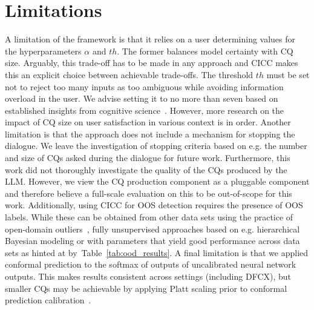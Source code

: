 \documentclass[11pt]{article}
\begin{document}

\section*{Limitations}
A limitation of the framework is that it relies on a user determining values for the hyperparameters $\alpha$ and $th$. The former balances model certainty with CQ size. Arguably, this trade-off has to be made in any approach and CICC makes this an explicit choice between achievable trade-offs. The threshold $th$ must be set not to reject too many inputs as too ambiguous while avoiding information overload in the user. We advise setting it to no more than seven based on established insights from cognitive science~\cite{miller1956magical}. However, more research on the impact of CQ size on user satisfaction in various context is in order. Another limitation is that the approach does not include a mechanism for stopping the dialogue. We leave the investigation of stopping criteria based on e.g. the number and size of CQs asked during the dialogue for future work. Furthermore, this work did not thoroughly investigate the quality of the CQs produced by the LLM. However, we view the CQ production component as a pluggable component and therefore believe a full-scale evaluation on this to be out-of-scope for this work. Additionally, using CICC for OOS detection requires the presence of OOS labels. While these can be obtained from other data sets using the practice of open-domain outliers~\cite{zhan2021out}, fully unsupervised approaches based on e.g. hierarchical Bayesian modeling or with parameters that yield good performance across data sets as hinted at by~Table~\ref{tab:ood_results}. A final limitation is that we applied conformal prediction to the softmax of outputs of uncalibrated neural network outputs. This makes results consistent across settings (including DFCX), but smaller CQs may be achievable by applying Platt scaling prior to conformal prediction calibration~\cite{platt1999probabilistic}.
\end{document}
